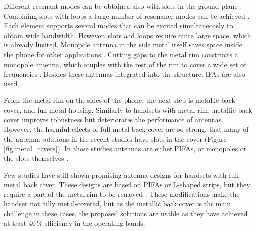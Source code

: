 Different resonant modes can be obtained also with slots in the ground plane \cite{yuan_slot}. Combining slots with loops a large number of resonance modes can be achieved \cite{hsu_compact}. Each element supports several modes that can be excited simultaneously to obtain wide bandwidth. However, slots and loops require quite large space, which is already limited. Monopole antenna in the side metal itself saves space inside the phone for other applications \cite{lee_monopole, valkonen_multifeed}. Cutting gaps to the metal rim constructs a monopole antenna, which couples with the rest of the rim to cover a wide set of frequencies \cite{chen_metal_frame}. Besides these antennas integrated into the structure, IFAs are also used \cite{hepta_ifa}. %

From the metal rim on the sides of the phone, the next step is metallic back cover, and full metal housing. Similarly to handsets with metal rim, metallic back cover improves robustness but deteriorates the performance of antennas. However, the harmful effects of full metal back cover are so strong, that many of the antenna solutions in the recent studies have slots in the cover (Figure \ref{fig:metal_covers}). In those studies antennas are either PIFAs, or monopoles or the slots themselves \cite{wu_pier, son_wideband_mimo, wu_tunable, zhong_pier}. 

Few studies have still shown promising antenna designs for handsets with full metal back cover. These designs are based on PIFAs or L-shaped strips, but they require a part of the metal rim to be removed \cite{chen_compact_lte, wu_pier}. These modifications make the handset not fully metal-covered, but as the metallic back cover is the main challenge in these cases, the proposed solutions are usable as they have achieved at least 40\,\% efficiency in the operating bands. %

